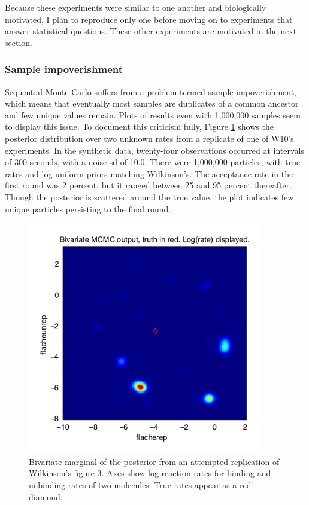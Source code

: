 \documentclass{article}
\begin{document}
Because these experiments were similar to one another and biologically motivated, I plan to reproduce only one before moving on to experiments that answer statistical questions. These other experiments are motivated in the next section.


\subsubsection{Sample impoverishment}
Sequential Monte Carlo suffers from a problem termed sample impoverishment, which means that eventually most samples are duplicates of a common ancestor and few unique values remain. Plots of results even with 1,000,000 samples seem to display this issue. To document this criticism fully, Figure \ref{fig:SigD_trial_may27} shows the posterior distribution over two unknown rates from a replicate of one of W10's experiments. In the synthetic data, twenty-four observations occurred at intervals of 300 seconds, with a noise sd of 10.0. There were 1,000,000 particles, with true rates and log-uniform priors matching Wilkinson's. The acceptance rate in the first round was 2 percent, but it ranged between 25 and 95 percent thereafter. Though the posterior is scattered around the true value, the plot indicates few unique particles persisting to the final round. 


\begin{figure}[h!]
\begin{center}
\includegraphics[height=4in,width=4in]{SigD_trial_small_bw_may27.png}
\caption{Bivariate marginal of the posterior from an attempted replication of Wilkinson's figure 3. Axes show log reaction rates for binding and unbinding rates of two molecules. True rates appear as a red diamond.}
\end{center}
\label{fig:SigD_trial_may27}
\end{figure}
\end{document}
